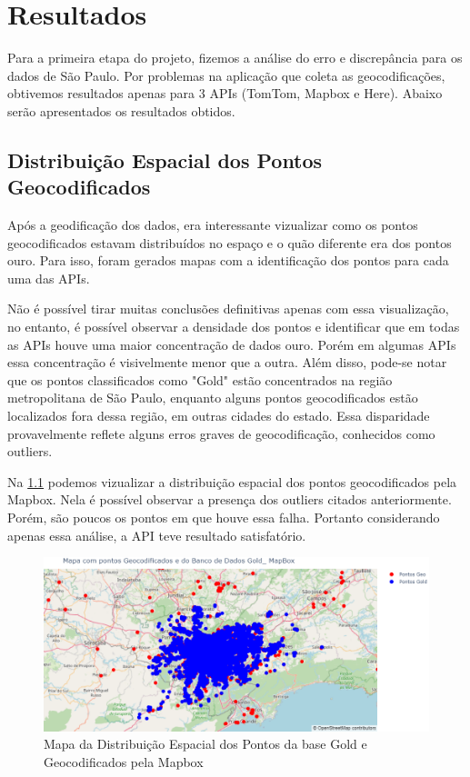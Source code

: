 \chapter{Resultados} \label{resultado}
Para a primeira etapa do projeto, fizemos a análise do erro e discrepância para os dados de São Paulo. Por problemas na aplicação que coleta as geocodificações, obtivemos resultados apenas para 3 APIs (TomTom, Mapbox e Here). Abaixo serão apresentados os resultados obtidos.

\section{Distribuição Espacial dos Pontos Geocodificados}
Após a geodificação dos dados, era interessante vizualizar como os pontos geocodificados estavam distribuídos no espaço e o quão diferente era dos pontos ouro. Para isso, foram gerados mapas com a identificação dos pontos para cada uma das APIs.

Não é possível tirar muitas conclusões definitivas apenas com essa visualização, no entanto, é possível observar a densidade dos pontos e identificar que em todas as APIs houve uma maior concentração de dados ouro. Porém em algumas APIs essa concentração é visivelmente menor que a outra. Além disso, pode-se notar que os pontos classificados como "Gold" estão concentrados na região metropolitana de São Paulo, enquanto alguns pontos geocodificados estão localizados fora dessa região, em outras cidades do estado. Essa disparidade provavelmente reflete alguns erros graves de geocodificação, conhecidos como outliers.

Na \ref{fig:mapapontos1} podemos vizualizar a distribuição espacial dos pontos geocodificados pela Mapbox. Nela é possível observar a presença dos outliers citados anteriormente. Porém, são poucos os pontos em que houve essa falha. Portanto considerando apenas essa análise, a API teve resultado satisfatório.

\begin{figure}[h] 
  \centering
  \includegraphics[width=\textwidth]{Figuras/mapapontos1.png}
  \caption{Mapa da Distribuição Espacial dos Pontos da base Gold e Geocodificados pela Mapbox}
  \label{fig:mapapontos1}
\end{figure}

